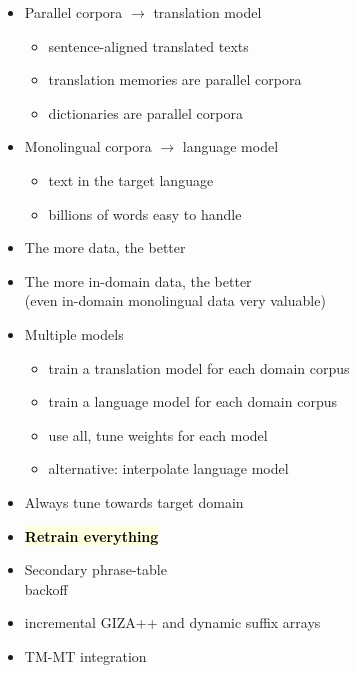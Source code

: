 \documentclass[landscape]{uedslides2C}
\newcommand{\currenttopic}[1]{\colorbox{lightyellow}{\textcolor{black}{\bf #1}}}
\begin{document}

\vspace{15mm}
\begin{itemize}
\item Parallel corpora $\rightarrow$ translation model
\begin{itemize}
\item sentence-aligned translated texts
\item translation memories are parallel corpora
\item dictionaries are parallel corpora
\end{itemize}
\item Monolingual corpora $\rightarrow$ language model
\begin{itemize}
\item text in the target language
\item billions of words easy to handle
\end{itemize}
\end{itemize}


\vspace{10mm}
\begin{itemize}
\item The more data, the better
\item The more in-domain data, the better\\
(even in-domain monolingual data very valuable)
\item Multiple models 
\begin{itemize}
\item train a translation model for each domain corpus
\item train a language model for each domain corpus
\item use all, tune weights for each model
\item alternative: interpolate language model
\end{itemize}
\item Always tune towards target domain
\end{itemize}


\begin{itemize}
\item \currenttopic{Retrain everything}
\item Secondary phrase-table
  \\ backoff
\item  incremental GIZA++ and dynamic suffix arrays
\item TM-MT integration

\end{itemize}
\end{document}
